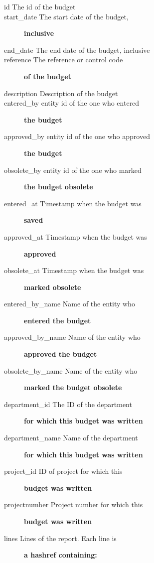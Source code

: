 \begin{description}
\begin{description}
\begin{description}
\begin{description}
\begin{description}
\begin{description}
\begin{description}
\begin{description}
\begin{description}
\item[{id
The id of the budget}] \mbox{}
\item[{start\_date The start date of the budget,}] \textbf{inclusive}
\item[{end\_date The end date of the budget, inclusive}] \mbox{}
\item[{reference The reference or control code}] \textbf{of the budget}
\item[{description
Description of the budget}] \mbox{}
\item[{entered\_by entity id of the one who entered}] \textbf{the budget}
\item[{approved\_by entity id of the one who approved}] \textbf{the budget}
\item[{obsolete\_by entity id of the one who marked}] \textbf{the budget obsolete}
\item[{entered\_at Timestamp when the budget was}] \textbf{saved}
\item[{approved\_at Timestamp when the budget was}] \textbf{approved}
\item[{obsolete\_at Timestamp when the budget was}] \textbf{marked obsolete}
\item[{entered\_by\_name Name of the entity who}] \textbf{entered the budget}
\item[{approved\_by\_name Name of the entity who}] \textbf{approved the budget}
\item[{obsolete\_by\_name Name of the entity who}] \textbf{marked the budget obsolete}
\item[{department\_id The ID of the department}] \textbf{for which this budget was written}
\item[{department\_name Name of the department}] \textbf{for which this budget was written}
\item[{project\_id ID of project for which this}] \textbf{budget was written}
\item[{projectnumber Project number for which this}] \textbf{budget was written}
\item[{lines Lines of the report. Each line is}] \textbf{a hashref containing:}\begin{description}


\end{description}
\end{description}
\end{description}
\end{description}
\end{description}
\end{description}
\end{description}
\end{description}
\end{description}
\end{description}
